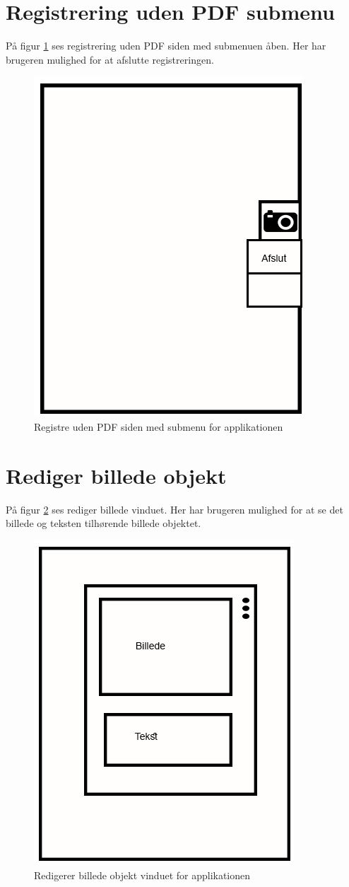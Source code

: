 \section{Registrering uden PDF submenu}\label{sec:RegUdenPDFSubMock}
På figur \ref{fig:RegUdenPDFSubMock} ses registrering uden PDF siden med submenuen åben. Her har brugeren mulighed for at afslutte registreringen.

\begin{figure}[H]
	\centering
	\includegraphics[width=0.4\linewidth]{MockUps/Mock/Ramboell-TilsynUden-sub}
	\caption{Registre uden PDF siden med submenu for applikationen}
	\label{fig:RegUdenPDFSubMock}
\end{figure}

\clearpage

\section{Rediger billede objekt}\label{sec:RedigerBilledeMock}
På figur \ref{fig:RedigerBilledeMock} ses rediger billede vinduet. Her har brugeren mulighed for at se det billede og teksten tilhørende billede objektet.

\begin{figure}[H]
	\centering
	\includegraphics[width=0.4\linewidth]{MockUps/Mock/Ramboell-RedigerBilledeOpbjekt}
	\caption{Redigerer billede objekt vinduet for applikationen}
	\label{fig:RedigerBilledeMock}
\end{figure}

